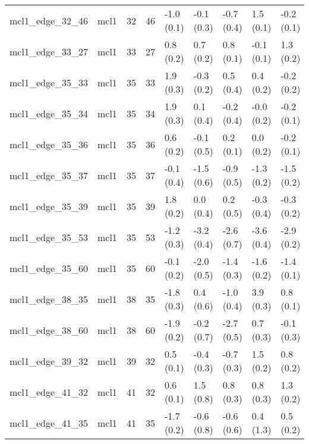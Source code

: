 \begin{tabular}{lllllllll}
mcl1\_edge\_32\_46                  &      mcl1 &          32 &          46 &  -1.0 (0.1) &        -0.1 (0.3) &  -0.7 (0.4) &   1.5 (0.1) &  -0.2 (0.1) \\
mcl1\_edge\_33\_27                  &      mcl1 &          33 &          27 &   0.8 (0.2) &         0.7 (0.2) &   0.8 (0.1) &  -0.1 (0.1) &   1.3 (0.2) \\
mcl1\_edge\_35\_33                  &      mcl1 &          35 &          33 &   1.9 (0.3) &        -0.3 (0.2) &   0.5 (0.4) &   0.4 (0.2) &  -0.2 (0.2) \\
mcl1\_edge\_35\_34                  &      mcl1 &          35 &          34 &   1.9 (0.3) &         0.1 (0.4) &  -0.2 (0.4) &  -0.0 (0.2) &  -0.2 (0.1) \\
mcl1\_edge\_35\_36                  &      mcl1 &          35 &          36 &   0.6 (0.2) &        -0.1 (0.5) &   0.2 (0.1) &   0.0 (0.2) &  -0.2 (0.1) \\
mcl1\_edge\_35\_37                  &      mcl1 &          35 &          37 &  -0.1 (0.4) &        -1.5 (0.6) &  -0.9 (0.5) &  -1.3 (0.2) &  -1.5 (0.2) \\
mcl1\_edge\_35\_39                  &      mcl1 &          35 &          39 &   1.8 (0.2) &         0.0 (0.4) &   0.2 (0.5) &  -0.3 (0.4) &  -0.3 (0.2) \\
mcl1\_edge\_35\_53                  &      mcl1 &          35 &          53 &  -1.2 (0.3) &        -3.2 (0.4) &  -2.6 (0.7) &  -3.6 (0.4) &  -2.9 (0.2) \\
mcl1\_edge\_35\_60                  &      mcl1 &          35 &          60 &  -0.1 (0.2) &        -2.0 (0.5) &  -1.4 (0.3) &  -1.6 (0.2) &  -1.4 (0.1) \\
mcl1\_edge\_38\_35                  &      mcl1 &          38 &          35 &  -1.8 (0.3) &         0.4 (0.6) &  -1.0 (0.4) &   3.9 (0.3) &   0.8 (0.1) \\
mcl1\_edge\_38\_60                  &      mcl1 &          38 &          60 &  -1.9 (0.2) &        -0.2 (0.7) &  -2.7 (0.5) &   0.7 (0.3) &  -0.1 (0.3) \\
mcl1\_edge\_39\_32                  &      mcl1 &          39 &          32 &   0.5 (0.1) &        -0.4 (0.3) &  -0.7 (0.3) &   1.5 (0.2) &   0.8 (0.2) \\
mcl1\_edge\_41\_32                  &      mcl1 &          41 &          32 &   0.6 (0.1) &         1.5 (0.8) &   0.8 (0.3) &   0.8 (0.3) &   1.3 (0.2) \\
mcl1\_edge\_41\_35                  &      mcl1 &          41 &          35 &  -1.7 (0.2) &        -0.6 (0.8) &  -0.6 (0.6) &   0.4 (1.3) &   0.5 (0.2) \\

\end{tabular}
